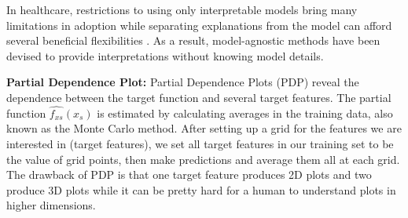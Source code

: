 In healthcare, restrictions to using only interpretable models bring many limitations in adoption while separating explanations from the model can afford several beneficial flexibilities \citep{ribeiro2016modelagnostic}. As a result, model-agnostic methods have been devised to provide interpretations without knowing model details.




\textbf{Partial Dependence Plot: } Partial Dependence Plots (PDP) reveal the dependence between the target function and several target features. The partial function $ \hat{f_{xs}}(x_s) $ is estimated by calculating averages in the training data, also known as the Monte Carlo method. After setting up a grid for the features we are interested in (target features), we set all target features in our training set to be the value of grid points, then make predictions and average them all at each grid. The drawback of PDP is that one target feature produces 2D plots and two produce 3D plots while it can be pretty hard for a human to understand plots in higher dimensions.

